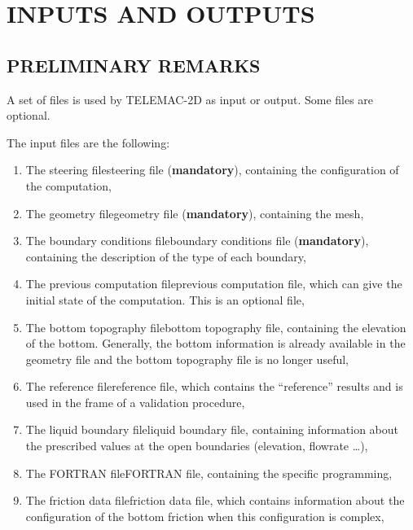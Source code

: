 
\chapter{  INPUTS AND OUTPUTS}


\section{ PRELIMINARY REMARKS}

 A set of files is used by TELEMAC-2D as input or output. Some files are optional.

 The input files are the following:

\begin{enumerate}
\item  The steering filesteering file (\textbf{mandatory}), containing the configuration of the computation,

\item  The geometry filegeometry file (\textbf{mandatory}), containing the mesh,

\item  The boundary conditions fileboundary conditions file (\textbf{mandatory}), containing the description of the type of each boundary,

\item  The previous computation fileprevious computation file, which can give the initial state of the computation. This is an optional file,

\item  The bottom topography filebottom topography file, containing the elevation of the bottom. Generally, the bottom information is already available in the geometry file and the bottom topography file is no longer useful,

\item  The reference filereference file, which contains the ``reference'' results and is used in the frame of a validation procedure,

\item  The liquid boundary fileliquid boundary file, containing information about the prescribed values at the open boundaries (elevation, flowrate {\dots}),

\item  The FORTRAN fileFORTRAN file, containing the specific programming,

\item  The friction data filefriction data file, which contains information about the configuration of the bottom friction when this configuration is complex,


\end{enumerate}
